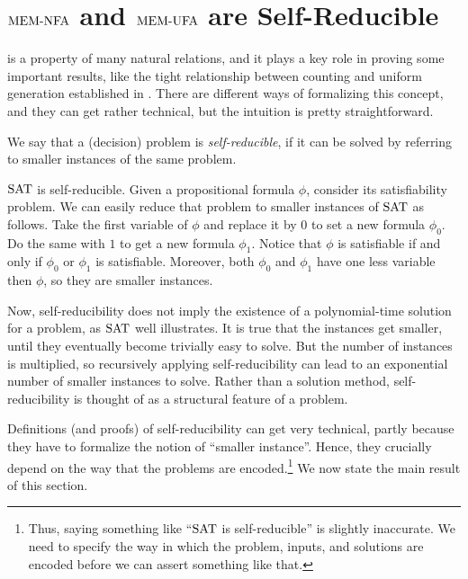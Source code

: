 \documentclass[11pt,twoside=off,numbers=noenddot]{scrbook}
\begin{document}
\section{$\text{MEM-NFA}$ and $\text{MEM-UFA}$ are Self-Reducible}
 is a property of many natural relations, and it plays a key role in proving some important results, like the tight relationship between counting and uniform generation established in \cite{jerrum1986random}. There are different ways of formalizing this concept, and they can get rather technical, but the intuition is pretty straightforward.

\begin{definition}
    We say that a (decision) problem is \emph{self-reducible}, if it can be solved by referring to smaller instances of the same problem.
\end{definition}

\begin{example}
    $\text{SAT}$ is self-reducible. Given a propositional formula $\phi$, consider its satisfiability problem. We can easily reduce that problem to smaller instances of $\text{SAT}$ as follows. Take the first variable of $\phi$ and replace it by $0$ to set a new formula $\phi_0$. Do the same with $1$ to get a new formula $\phi_1$. Notice that $\phi$ is satisfiable if and only if $\phi_0$ or $\phi_1$ is satisfiable. Moreover, both $\phi_0$ and $\phi_1$ have one less variable then $\phi$, so they are smaller instances.
\end{example}

Now, self-reducibility does not imply the existence of a polynomial-time solution for a problem, as $\text{SAT}$ well illustrates. It is true that the instances get smaller, until they eventually become trivially easy to solve. But the number of instances is multiplied, so recursively applying self-reducibility can lead to an exponential number of smaller instances to solve. Rather than a solution method, self-reducibility is thought of as a structural feature of a problem.

Definitions (and proofs) of self-reducibility can get very technical, partly because they have to formalize the notion of ``smaller instance''. Hence, they crucially depend on the way that the problems are encoded.\footnote{Thus, saying something like ``$\text{SAT}$ is self-reducible'' is slightly inaccurate. We need to specify the way in which the problem, inputs, and solutions are encoded before we can assert something like that.} We now state the main result of this section.
\end{document}
